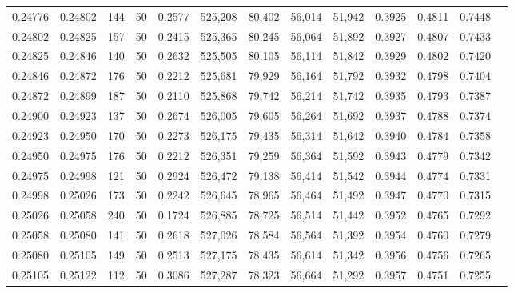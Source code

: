 \begin{tabular}{rrrrrrrrrrrrr}
0.24776 & 0.24802 &   144 &  50 &                                     0.2577 & 525,208 &  80,402 &  56,014 &  51,942 & 0.3925 & 0.4811 & 0.7448 \\
0.24802 & 0.24825 &   157 &  50 &                                     0.2415 & 525,365 &  80,245 &  56,064 &  51,892 & 0.3927 & 0.4807 & 0.7433 \\
0.24825 & 0.24846 &   140 &  50 &                                     0.2632 & 525,505 &  80,105 &  56,114 &  51,842 & 0.3929 & 0.4802 & 0.7420 \\
0.24846 & 0.24872 &   176 &  50 &                                     0.2212 & 525,681 &  79,929 &  56,164 &  51,792 & 0.3932 & 0.4798 & 0.7404 \\
0.24872 & 0.24899 &   187 &  50 &                                     0.2110 & 525,868 &  79,742 &  56,214 &  51,742 & 0.3935 & 0.4793 & 0.7387 \\
0.24900 & 0.24923 &   137 &  50 &                                     0.2674 & 526,005 &  79,605 &  56,264 &  51,692 & 0.3937 & 0.4788 & 0.7374 \\
0.24923 & 0.24950 &   170 &  50 &                                     0.2273 & 526,175 &  79,435 &  56,314 &  51,642 & 0.3940 & 0.4784 & 0.7358 \\
0.24950 & 0.24975 &   176 &  50 &                                     0.2212 & 526,351 &  79,259 &  56,364 &  51,592 & 0.3943 & 0.4779 & 0.7342 \\
0.24975 & 0.24998 &   121 &  50 &                                     0.2924 & 526,472 &  79,138 &  56,414 &  51,542 & 0.3944 & 0.4774 & 0.7331 \\
0.24998 & 0.25026 &   173 &  50 &                                     0.2242 & 526,645 &  78,965 &  56,464 &  51,492 & 0.3947 & 0.4770 & 0.7315 \\
0.25026 & 0.25058 &   240 &  50 &                                     0.1724 & 526,885 &  78,725 &  56,514 &  51,442 & 0.3952 & 0.4765 & 0.7292 \\
0.25058 & 0.25080 &   141 &  50 &                                     0.2618 & 527,026 &  78,584 &  56,564 &  51,392 & 0.3954 & 0.4760 & 0.7279 \\
0.25080 & 0.25105 &   149 &  50 &                                     0.2513 & 527,175 &  78,435 &  56,614 &  51,342 & 0.3956 & 0.4756 & 0.7265 \\
0.25105 & 0.25122 &   112 &  50 &                                     0.3086 & 527,287 &  78,323 &  56,664 &  51,292 & 0.3957 & 0.4751 & 0.7255 \\

\end{tabular}
